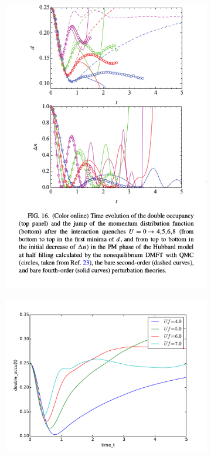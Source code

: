 \begin{figure}[H]
  \caption{}
\end{figure}

\begin{figure}[H]
\begin{subfigure}{.5\textwidth}
 \includegraphics[width=1.1\linewidth]{bench_marking/HUB_para_quench_literature_large_U.png}
  \caption{}
\end{subfigure}%
\begin{subfigure}{.5\textwidth}
  \includegraphics[width=1.1\linewidth]{bench_marking/HUB_para_quench_code_large_U.pdf}

\end{subfigure}
\end{figure}
